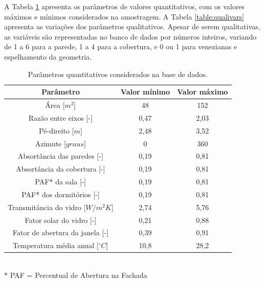 \documentclass{article}
\begin{document}
A Tabela \ref{table:quantvars} apresenta os parâmetros de valores quantitativos, com os valores máximos e mínimos considerados na amostragem. 
A Tabela \ref{table:qualivars} apresenta as variações dos parâmetros qualitativos. Apesar de serem qualitativas, as variáveis são representadas no banco de dados por números inteiros, variando de 1 a 6 para a parede, 1 a 4 para a cobertura, e 0 ou 1 para venezianas e espelhamento da geometria.

\begin{table}[h!]
	\centering
	\caption{Parâmetros quantitativos considerados na base de dados.}
	\label{table:quantvars}
	\begin{tabular}{|c |c |c |}
		\hline
		\textbf{Parâmetro} & \textbf{Valor mínimo} & \textbf{Valor máximo} \\
		\hline
		Área [$m^{2}$] & 48 & 152 \\
		\hline
		Razão entre eixos [-] & 0,47 & 2,03 \\
		\hline
		Pé-direito [$m$] & 2,48 & 3,52 \\
		\hline
		Azimute [$graus$] & 0 & 360 \\
		\hline
		Absortância das paredes [-] & 0,19 & 0,81 \\
		\hline
		Absortância da cobertura [-] & 0,19 & 0,81 \\
		\hline
		PAF* da sala [-] & 0,19 & 0,81 \\
		\hline
		PAF* dos dormitórios [-] &  0,19 & 0,81 \\
		\hline
		Transmitância do vidro [$W/m^{2}K$] & 2,74 & 5,76 \\
		\hline
		Fator solar do vidro [-] & 0,21 & 0,88 \\
		\hline
		Fator de abertura da janela [-] & 0,39 & 0,91 \\
		\hline
		Temperatura média anual [$^{\circ}C$] & 10,8 & 28,2 \\
		\hline 
	\end{tabular}\\
	\small{* PAF = Percentual de Abertura na Fachada}
\end{table}
\end{document}
